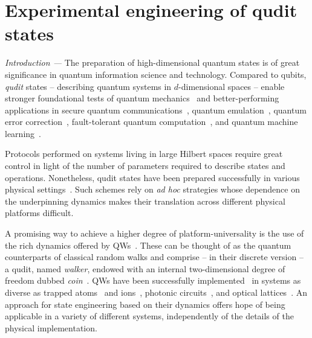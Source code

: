 
\chapter{Experimental engineering of qudit states}

\textit{Introduction ---}
The preparation of high-dimensional quantum states is of great significance in quantum information science and technology. 
Compared to qubits, \textit{qudit} states -- describing quantum systems in $d$-dimensional spaces --
enable stronger foundational tests of quantum mechanics~\cite{vértesi2010closing,brunner2014bell, lapkiewicz2011experimental} and better-performing applications in secure quantum communications~\cite{bechmannpasquinucci2000quantum, fitzi2001quantum, cerf2002security, bru2002optimal, acin2003security, langford2004measuring}, quantum emulation~\cite{buluta2009quantum,neeley2009emulation}, quantum error correction~\cite{chuang1997bosonic,duclos-cianci2013kitaev,michael2016class}, fault-tolerant quantum computation~\cite{bartlett2002quantum, ralph2007efficient,lanyon2008simplifying,campbell2012magicstate,campbell2014enhanced}, and quantum machine learning~\cite{schuld2014introduction,dunjko2017machine,biamonte2017quantum}. 

Protocols performed on systems living in large Hilbert spaces require great control in light of the number of parameters required to describe states and operations. Nonetheless, qudit states have been prepared successfully in various physical settings~\cite{leibfried1996experimental,hofheinz2009synthesizing,neeley2009emulation,walborn2006quantum,lima2011experimental,rossi2009multipath,dada2011experimental,anderson2015accurate,heeres2017implementing,rosenblum2018cnot,chu2018creation}. Such schemes rely on \textit{ad hoc} strategies whose dependence on the underpinning dynamics makes their translation across different physical platforms difficult. 

A promising way to achieve a higher degree of platform-universality is the use of the rich dynamics offered by \acp{QW}~\cite{aharonov1993quantum,kempe2003quantum, venegasandraca2012quantum}. These can be thought of as the quantum counterparts of classical random walks and comprise -- in their discrete version -- a qudit, named \emph{walker}, endowed with an internal two-dimensional degree of freedom dubbed \emph{coin}~\cite{ambainis2001onedimensional}. \acp{QW} have been successfully implemented~\cite{manouchehri2014physical} in systems as diverse as trapped atoms~\cite{cote2006quantum} and ions~\cite{schmitz2009quantum,zhringer2010realization}, photonic circuits~\cite{perets2008realization,peruzzo2010quantum,broome2010discrete,schreiber2010photons,rohde2011multi,sansoni2012twoparticle,boutari2016large,cardano2015quantum,cardano2016statistical,caruso2016fast}, and optical lattices~\cite{meinert2014observation}. An approach for state engineering based on their dynamics offers hope of being applicable in a variety of different systems, independently of the details of the physical implementation.

